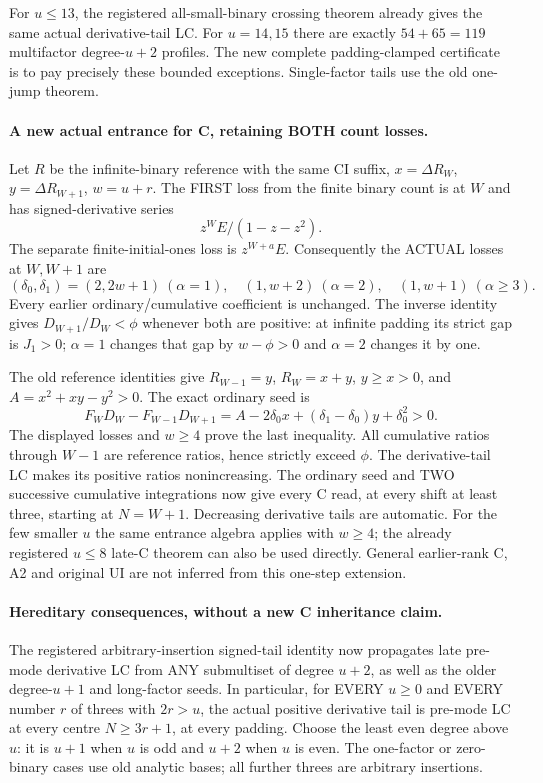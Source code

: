 For $u\le13$, the registered all-small-binary crossing theorem already
gives the same actual derivative-tail LC. For $u=14,15$ there are
exactly $54+65=119$ multifactor degree-$u+2$ profiles. The new
complete padding-clamped certificate is to pay precisely these
bounded exceptions. Single-factor tails use the old one-jump theorem.

\paragraph{A new actual entrance for C, retaining BOTH count losses.}
Let $R$ be the infinite-binary reference with the same CI suffix,
$x=\Delta R_W$, $y=\Delta R_{W+1}$, $w=u+r$.
The FIRST loss from the finite binary count is at $W$ and has
signed-derivative series
\[
 z^W E/(1-z-z^2).
\]
The separate finite-initial-ones loss is $z^{W+a}E$.
Consequently the ACTUAL losses at $W,W+1$ are
\[
 (\delta_0,\delta_1)=
 (2,2w+1)\ (\alpha=1),\quad
 (1,w+2)\ (\alpha=2),\quad
 (1,w+1)\ (\alpha\ge3).
\]
Every earlier ordinary/cumulative coefficient is unchanged.
The inverse identity gives $D_{W+1}/D_W<\phi$ whenever both
are positive: at infinite padding its strict gap is $J_1>0$;
$\alpha=1$ changes that gap by $w-\phi>0$ and
$\alpha=2$ changes it by one.

The old reference identities give $R_{W-1}=y$, $R_W=x+y$,
$y\ge x>0$, and $A=x^2+xy-y^2>0$. The exact ordinary seed is
\[
 F_WD_W-F_{W-1}D_{W+1}
   =A-2\delta_0x+(\delta_1-\delta_0)y+\delta_0^2>0.
\]
The displayed losses and $w\ge4$ prove the last inequality.
All cumulative ratios through $W-1$ are reference ratios, hence
strictly exceed $\phi$. The derivative-tail LC makes its positive
ratios nonincreasing. The ordinary seed and TWO successive cumulative
integrations now give every C read, at every shift at least three,
starting at $N=W+1$. Decreasing derivative tails are automatic.
For the few smaller $u$ the same entrance algebra applies with
$w\ge4$; the already registered $u\le8$ late-C theorem can also
be used directly. General earlier-rank C, A2 and original UI are
not inferred from this one-step extension.

\paragraph{Hereditary consequences, without a new C inheritance claim.}
The registered arbitrary-insertion signed-tail identity now propagates
late pre-mode derivative LC from ANY submultiset of degree $u+2$,
as well as the older degree-$u+1$ and long-factor seeds.
In particular, for EVERY $u\ge0$ and EVERY number $r$ of threes
with $2r>u$, the actual positive derivative tail is pre-mode LC at
every centre $N\ge3r+1$, at every padding. Choose the least even
degree above $u$: it is $u+1$ when $u$ is odd and $u+2$ when
$u$ is even. The one-factor or zero-binary cases use old analytic
bases; all further threes are arbitrary insertions.


